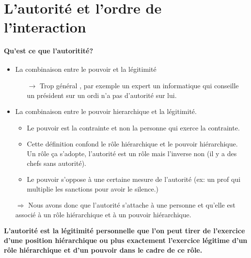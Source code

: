 \documentclass[11pt]{article} %
\begin{document}
\section{L'autorité et l'ordre de l'interaction}

\paragraph{Qu'est ce que l'autoritité?}
\begin{itemize}
	\item La combinaison entre le pouvoir et la légitimité 
        \begin{itemize}
            \item[$\to$] Trop général , par exemple
	un expert un informatique qui conseille un président sur un ordi n'a pas d'autorité sur lui.
        \end{itemize}

	\item La combinaison entre le pouvoir hierarchique et la légitimité.
		\begin{itemize}
			\item Le pouvoir est la contrainte et non la personne qui exerce la contrainte.
			\item Cette définition confond le rôle hiérarchique et le pouvoir hiérarchique. Un 
			rôle ça s'adopte, l'autorité est un rôle mais l'inverse non (il y a des chefs sans autorité).
			\item Le pouvoir s'oppose à une certaine mesure de l'autorité (ex: un prof qui multiplie
			les sanctions pour avoir le silence.)
		\end{itemize}

    \item[$\Rightarrow$] Nous avons donc que l'autorité s'attache à   
 une personne et qu'elle est associé à un rôle hiérarchique et à   
 un pouvoir hiérarchique.                                              
\end{itemize}

\begin{center}
    \textbf{L'autorité est la légitimité personnelle que l'on peut tirer
    de l'exercice d'une position hiérarchique ou plus exactement l'exercice
    légitime d'un rôle hiérarchique et d'un pouvoir dans le cadre de ce
    rôle.}
\end{center}
\end{document}
